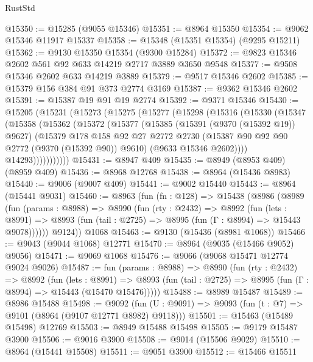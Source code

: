 \begin{lexlean}{RustStd}
\begin{coremodule}
@15350 := @15285 (@9055 @15346)
@15351 := @8964 @15350
@15354 := @9062 @15346 @11917 @15337
@15358 := @15348 (@15351 @15354) (@9295 @15211)
@15362 := @9130 @15350 @15354 (@9300 @15284)
@15372 := @9823 @15346 @2602 @561 @92 @633 @14219 @2717 @3889 @3650 @9548
@15377 := @9508 @15346 @2602 @633 @14219 @3889
@15379 := @9517 @15346 @2602
@15385 := @15379 @156 @384 @91 @373 @2774 @3169
@15387 := @9362 @15346 @2602
@15391 := @15387 @19 @91 @19 @2774
@15392 := @9371 @15346
@15430 := @15205
    (@15231
      (@15273
        (@15275
          (@15277
            (@15298
              (@15316
                (@15330
                  (@15347
                    (@15358
                      (@15362
                        (@15372
                          (@15377
                            (@15385
                              (@15391 (@9370 (@15392 @19)) @9627)
                              (@15379
                                @178
                                @158
                                @92
                                @27
                                @2772
                                @2730
                                (@15387 @90 @92 @90 @2772 (@9370 (@15392 @90)) @9610)
                                (@9633 @15346 @2602))))
                          @14293)))))))))))
@15431 := @8947 @409
@15435 := @8949 (@8953 @409) (@8959 @409)
@15436 := @8968 @12768
@15438 := @8964 (@15436 @8983)
@15440 := @9006 (@9007 @409)
@15441 := @9002 @15440
@15443 := @8964 (@15441 @9031)
@15460 := @8963
    (fun (fn : @128) =>
    @15438
      (@8986
        (@8989
          (fun (params : @8988) =>
          @8990
            (fun (rty : @2432) =>
            @8992
              (fun (lets : @8991) =>
              @8993 (fun (tail : @2725) => @8995 (fun (Γ : @8994) => @15443 @9078))))))
        @9124))
    @1068
@15463 := @9130 (@15436 (@8981 @1068))
@15466 := @9043 (@9044 @1068) @12771
@15470 := @8964 (@9035 (@15466 @9052) @9056)
@15471 := @9069 @1068
@15476 := @9066 (@9068 @15471 @12774 @9024 @9026)
@15487 := fun (params : @8988) =>
  @8990
    (fun (rty : @2432) =>
    @8992
      (fun (lets : @8991) =>
      @8993 (fun (tail : @2725) => @8995 (fun (Γ : @8994) => @15443 (@15470 @15476)))))
@15488 := @8989 @15487
@15489 := @8986 @15488
@15498 := @9092
    (fun (U : @9091) => @9093 (fun (t : @7) => @9101 (@8964 (@9107 @12771 @8982) @9118)))
@15501 := @15463 (@15489 @15498) @12769
@15503 := @8949 @15488 @15498
@15505 := @9179 @15487 @3900
@15506 := @9016 @3900
@15508 := @9014 (@15506 @9029)
@15510 := @8964 (@15441 @15508)
@15511 := @9051 @3900
@15512 := @15466 @15511

\end{coremodule}
\end{lexlean}

